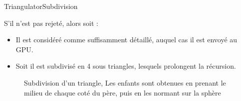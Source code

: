 \documentclass[french]{beamer}
\begin{document}
 \begin{frame}{Triangulator}{Subdivision}
     

S'il n'est pas rejeté, alors soit :
\begin{itemize}
    \item Il est considéré comme suffisamment détaillé, auquel cas il est envoyé au GPU.
    \item Soit il est subdivisé en 4 sous triangles, lesquels prolongent la récursion. 
\end{itemize}



\begin{figure}
\caption{Subdivision d'un triangle, Les enfants sont obtenues en prenant le milieu de chaque coté du père, puis en les normant sur la sphère}
\centerline{
}
\end{figure}
\end{frame}
\end{document}
